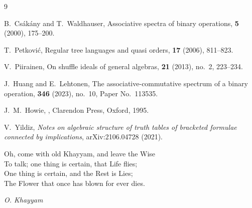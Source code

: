 \documentclass[11pt]{article}
\begin{document}
\newpage

\begin{thebibliography}{9}

B.~Cs\'{a}k\'{a}ny and T.~Waldhauser,
\newblock Associative spectra of binary operations,
 \textbf{5} (2000), 175--200.

T.~Petkovi\'{c},
\newblock Regular tree languages and quasi orders,
 \textbf{17} (2006), 811--823.

V.~Piirainen,
\newblock On shuffle ideals of general algebras,
 \textbf{21} (2013), no.~2, 223--234.

J.~Huang and E.~Lehtonen,
\newblock The associative-commutative spectrum of a binary operation,
 \textbf{346} (2023), no.~10, Paper No.~113535.

J.~M.~Howie,
,
\newblock Clarendon Press, Oxford, 1995.

V.~Yildiz,
\newblock \emph{Notes on algebraic structure of truth tables of bracketed formulae connected by implications},
\newblock arXiv:2106.04728 (2021).

\end{thebibliography}



\vspace{36em}




\HRule
{\small
\begin{flushleft}
Oh, come with old Khayyam, and leave the Wise \\
To talk; one thing is certain, that Life flies; \\
     One thing is certain, and the Rest is Lies;  \\
The Flower that once has blown for ever dies.\\
\end{flushleft}
\begin{flushleft}
{\em O. Khayyam}
\end{flushleft}
}
\HRule
\end{document}
